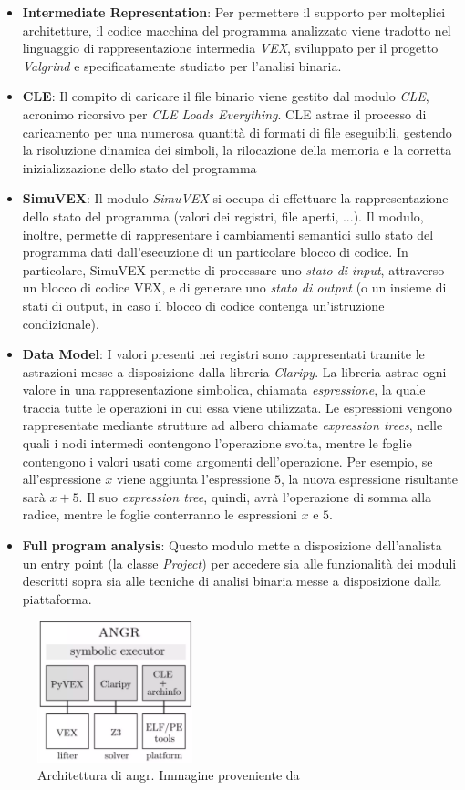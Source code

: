 \documentclass[../main.tex]{subfiles}
\begin{document}
\begin{itemize}
    \item \textbf{Intermediate Representation}: Per permettere il supporto per molteplici architetture, il codice macchina del programma analizzato viene tradotto nel linguaggio di rappresentazione intermedia \textit{VEX}, sviluppato per il progetto \textit{Valgrind} e specificatamente studiato per l'analisi binaria.
    \item \textbf{CLE}: Il compito di caricare il file binario viene gestito dal modulo \textit{CLE}, acronimo ricorsivo per \textit{CLE Loads Everything}. CLE astrae il processo di caricamento per una numerosa quantità di formati di file eseguibili, gestendo la risoluzione dinamica dei simboli, la rilocazione della memoria
    e la corretta inizializzazione dello stato del programma
    \item \textbf{SimuVEX}: Il modulo \textit{SimuVEX} si occupa di effettuare la rappresentazione dello stato del programma (valori dei registri, file aperti, ...). Il modulo, inoltre, permette di rappresentare i cambiamenti semantici sullo stato del programma dati dall'esecuzione di un particolare blocco di codice. In particolare, SimuVEX permette
    di processare uno \textit{stato di input}, attraverso un blocco di codice VEX, e di generare uno \textit{stato di output} (o un insieme di stati di output, in caso il blocco di codice contenga un'istruzione condizionale). 
    \item \textbf{Data Model}: I valori presenti nei registri sono rappresentati tramite le astrazioni messe a disposizione dalla libreria \textit{Claripy}. 
    La libreria astrae ogni valore in una rappresentazione simbolica, chiamata \textit{espressione}, la quale traccia tutte le operazioni in cui essa viene utilizzata.
    Le espressioni vengono rappresentate mediante strutture ad albero chiamate \textit{expression trees}, nelle quali i nodi intermedi contengono l'operazione svolta, mentre le foglie contengono i valori usati come argomenti dell'operazione.
    Per esempio, se all'espressione $x$ viene aggiunta l'espressione $5$, la nuova espressione risultante sarà $x+5$. Il suo \textit{expression tree}, quindi, avrà l'operazione di somma alla radice, mentre le foglie conterranno le espressioni $x$ e $5$.
    \item \textbf{Full program analysis}: Questo modulo mette a disposizione dell'analista un entry point (la classe \textit{Project}) per accedere sia alle funzionalità dei moduli descritti sopra sia alle tecniche di analisi binaria messe a disposizione dalla piattaforma.
\end{itemize}
\begin{figure}[H]
    \centering
    \includegraphics[width = 0.40\textwidth]{../images/angr_architecture.png}
    \caption{Architettura di angr. Immagine proveniente da \cite{angr_architecture}}
\end{figure}
\end{document}
